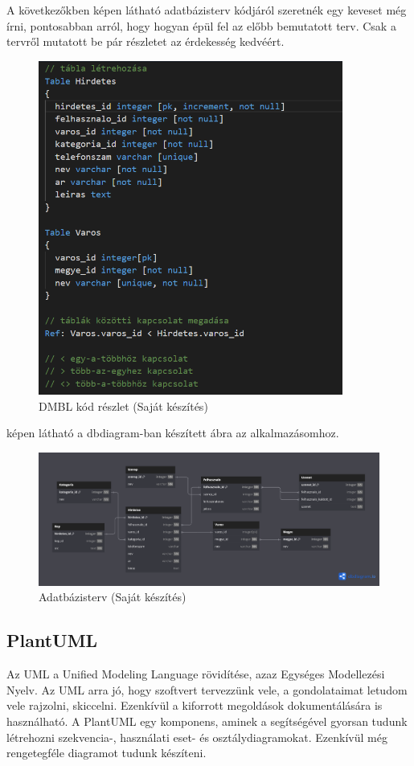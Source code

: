 \documentclass[]{thesis-ekf}
\theoremstyle{definition}
\theoremstyle{remark}
\begin{document}
	A következőkben  képen látható adatbázisterv kódjáról szeretnék egy keveset még írni, pontosabban arról, hogy hogyan épül fel az előbb bemutatott terv. Csak a tervről mutatott be pár részletet az érdekesség kedvéért.
	
	\begin{figure}[ht!]
		\centering
		\includegraphics[width=10cm]{./tervezes/dbKod}
		\caption{DMBL kód részlet (Saját készítés)} 
		\label{dbKod}
	\end{figure}
	
	 képen látható a dbdiagram-ban készített ábra az alkalmazásomhoz.
	
	\begin{figure}[ht!]
		\centering
		\includegraphics[width=15cm]{./tervezes/dbdiagram}
		\caption{Adatbázisterv (Saját készítés)} 
		\label{dbdiagram}
	\end{figure}
	
	\subsection{PlantUML}\label{sc-plantuml}
	Az UML a Unified Modeling Language rövidítése, azaz Egységes Modellezési Nyelv. Az UML arra jó, hogy szoftvert tervezzünk vele, a gondolataimat letudom vele rajzolni, skiccelni. Ezenkívül a kiforrott megoldások dokumentálására is használható. A PlantUML egy komponens, aminek a segítségével gyorsan tudunk létrehozni szekvencia-, használati eset- és osztálydiagramokat. Ezenkívül még rengetegféle diagramot tudunk készíteni. \cite{PlantUML}
	
\end{document}
